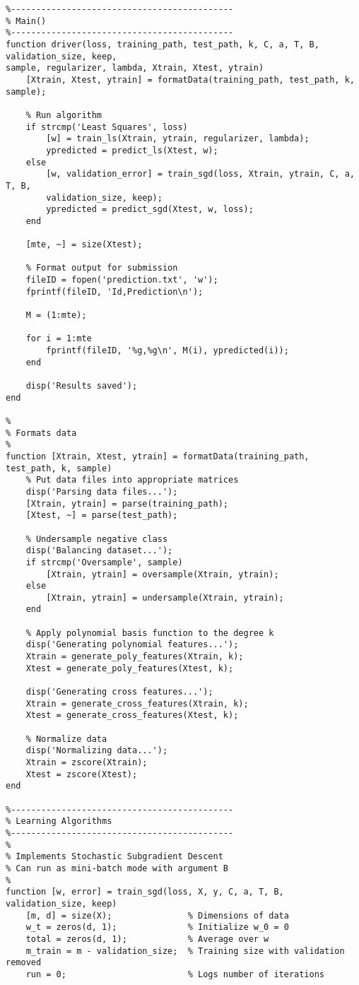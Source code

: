\documentclass[11pt, oneside]{article}   	%
\begin{document}
\begin{verbatim}
%--------------------------------------------
% Main()
%--------------------------------------------
function driver(loss, training_path, test_path, k, C, a, T, B, validation_size, keep, 
sample, regularizer, lambda, Xtrain, Xtest, ytrain)
    [Xtrain, Xtest, ytrain] = formatData(training_path, test_path, k, sample);
    
    % Run algorithm
    if strcmp('Least Squares', loss)
        [w] = train_ls(Xtrain, ytrain, regularizer, lambda);
        ypredicted = predict_ls(Xtest, w);
    else
        [w, validation_error] = train_sgd(loss, Xtrain, ytrain, C, a, T, B, 
        validation_size, keep);
        ypredicted = predict_sgd(Xtest, w, loss);
    end
    
    [mte, ~] = size(Xtest);
    
    % Format output for submission
    fileID = fopen('prediction.txt', 'w');
    fprintf(fileID, 'Id,Prediction\n');
    
    M = (1:mte);
    
    for i = 1:mte
        fprintf(fileID, '%g,%g\n', M(i), ypredicted(i));
    end
    
    disp('Results saved');
end

%
% Formats data
%
function [Xtrain, Xtest, ytrain] = formatData(training_path, test_path, k, sample)
    % Put data files into appropriate matrices
    disp('Parsing data files...');
    [Xtrain, ytrain] = parse(training_path);
    [Xtest, ~] = parse(test_path);
    
    % Undersample negative class
    disp('Balancing dataset...');
    if strcmp('Oversample', sample)
        [Xtrain, ytrain] = oversample(Xtrain, ytrain);
    else
        [Xtrain, ytrain] = undersample(Xtrain, ytrain);
    end
    
    % Apply polynomial basis function to the degree k
    disp('Generating polynomial features...');
    Xtrain = generate_poly_features(Xtrain, k);
    Xtest = generate_poly_features(Xtest, k);
    
    disp('Generating cross features...');
    Xtrain = generate_cross_features(Xtrain, k);
    Xtest = generate_cross_features(Xtest, k);
    
    % Normalize data
    disp('Normalizing data...');
    Xtrain = zscore(Xtrain);
    Xtest = zscore(Xtest);
end

%--------------------------------------------
% Learning Algorithms
%--------------------------------------------
%
% Implements Stochastic Subgradient Descent
% Can run as mini-batch mode with argument B
%
function [w, error] = train_sgd(loss, X, y, C, a, T, B, validation_size, keep)
    [m, d] = size(X);               % Dimensions of data
    w_t = zeros(d, 1);              % Initialize w_0 = 0
    total = zeros(d, 1);            % Average over w
    m_train = m - validation_size;  % Training size with validation removed
    run = 0;                        % Logs number of iterations
    

\end{verbatim}
\end{document}
